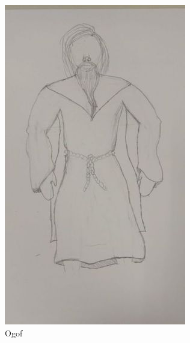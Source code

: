 \begin{figure}[htb]
	\caption{\label{Ogof}Ogof}
	\begin{center}
	    \includegraphics[width=\textwidth/2]{imagens/Ogof.jpg}
	\end{center}
\end{figure}

\clearpage

